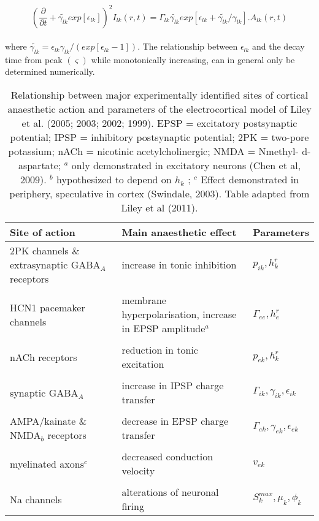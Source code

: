 \documentclass[a4paper,12pt]{article}
\begin{document}
\begin{equation} \label{eq:i_lk_aug}
\left( \frac{\partial}{\partial t} + \tilde{\gamma_{lk}}exp[\epsilon_{lk}] \right)^2 I_{lk}(r,t) = \Gamma_{lk}\tilde{\gamma_{lk}}exp[\epsilon_{lk} + \tilde{\gamma_{lk}}/\gamma_{lk}].A_{lk}(r,t)
\end{equation}
\\
where $\tilde{\gamma_{lk}} = \epsilon_{lk}\gamma_{lk}/(exp[\epsilon_{lk} - 1])$. The relationship between $\epsilon_{lk}$ and the decay time from peak $(\varsigma)$ while monotonically increasing, can in general only
be determined numerically.

\begin{table}[h]
\label{table:site_of_action} 
\begin{tabular}{p{5cm} p{5cm} l}
\hline 
 Site of action & Main anaesthetic effect & Parameters \\
\hline
2PK channels \& extrasynaptic GABA$_A$ receptors & increase in tonic inhibition & $p_{ik}, h_k^r$ \\
\\
HCN1 pacemaker channels & membrane hyperpolarisation, increase in EPSP amplitude$^a$ & $\Gamma_{ee}, h_e^r$\\
\\
nACh receptors & reduction in tonic excitation & $p_{ek}, h_k^r$ \\
\\
synaptic GABA$_A$ & increase in IPSP charge transfer & $\Gamma_{ik}, \gamma_{ik}, \epsilon_{ik}$\\
\\
AMPA/kainate \& NMDA$_b$ receptors & decrease in EPSP charge transfer & $\Gamma_{ek}, \gamma_{ek}, \epsilon_{ek}$\\
\\
myelinated axons$^c$ & decreased conduction velocity & $v_{ek}$\\
\\
Na channels & alterations of neuronal firing & $S_k^{max}, \mu_k, \phi_k$\\
\hline
\end{tabular}
\caption{Relationship between major experimentally identified sites of
cortical anaesthetic action and parameters of the electrocortical model
of Liley et al. (2005; 2003; 2002; 1999). EPSP = excitatory
postsynaptic potential; IPSP = inhibitory postsynaptic potential; 2PK =
two-pore potassium; nACh = nicotinic acetylcholinergic; NMDA = Nmethyl-
d-aspartate; $^a$ only demonstrated in excitatory neurons (Chen
et al, 2009). $^b$ hypothesized to depend on $h_k$ ; $^c$ Effect demonstrated
in periphery, speculative in cortex (Swindale, 2003). Table adapted
from Liley et al (2011).}
\end{table}
\end{document}
